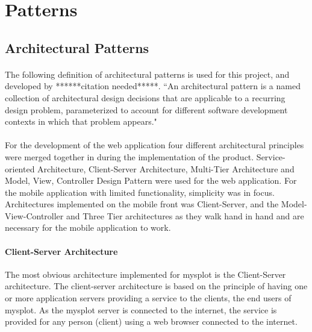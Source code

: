 \documentclass[11pt]{report}
\begin{document}
\newpage
\section{Patterns}



\subsection{Architectural Patterns}
\paragraph{} The following definition of architectural patterns is used for this project, and developed by ******citation needed*****. 
\bigskip
``An architectural pattern is a named collection of architectural design decisions that are applicable to a recurring design problem, parameterized to account for different software development contexts in which that problem appears."

\paragraph{} For the development of the web application four different architectural principles were merged together in during the implementation of the product. Service-oriented Architecture, Client-Server Architecture, Multi-Tier Architecture and Model, View, Controller Design Pattern were used for the web application. For the mobile application with limited functionality, simplicity was in focus. Architectures implemented on the mobile front was Client-Server, and the Model-View-Controller and Three Tier architectures as they walk hand in hand and are necessary for the mobile application to work. 

\paragraph{Client-Server Architecture} The most obvious architecture implemented for mysplot is the Client-Server architecture. The client-server architecture is based on the principle of having one or more application servers providing a service to the clients, the end users of mysplot. As the mysplot server is connected to the internet, the service is provided for any person (client) using a web browser connected to the internet. 
\end{document}
